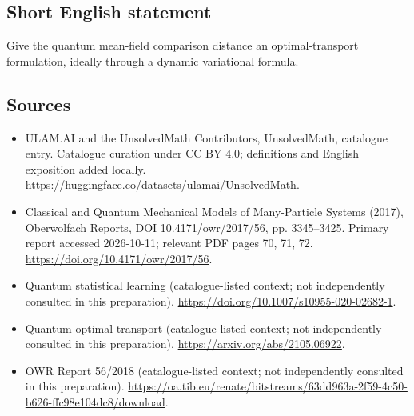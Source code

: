 \documentclass[11pt]{article}
\begin{document}
\subsection{Short English statement}
Give the quantum mean-field comparison distance an optimal-transport formulation, ideally through a dynamic variational formula.
\subsection{Sources}
\begin{itemize}
\item[\hypertarget{source:statement:1}{S1}] ULAM.AI and the UnsolvedMath Contributors, UnsolvedMath, catalogue entry. Catalogue curation under CC BY 4.0; definitions and English exposition added locally.
\url{https://huggingface.co/datasets/ulamai/UnsolvedMath}.
\item[\hypertarget{source:statement:2}{S2}] Classical and Quantum Mechanical Models of Many-Particle Systems (2017), Oberwolfach Reports, DOI 10.4171/owr/2017/56, pp. 3345--3425. Primary report accessed 2026-10-11; relevant PDF pages 70, 71, 72.
\url{https://doi.org/10.4171/owr/2017/56}.
\item[\hypertarget{source:statement:3}{S3}] Quantum statistical learning (catalogue-listed context; not independently consulted in this preparation).
\url{https://doi.org/10.1007/s10955-020-02682-1}.
\item[\hypertarget{source:statement:4}{S4}] Quantum optimal transport (catalogue-listed context; not independently consulted in this preparation).
\url{https://arxiv.org/abs/2105.06922}.
\item[\hypertarget{source:statement:5}{S5}] OWR Report 56/2018 (catalogue-listed context; not independently consulted in this preparation).
\url{https://oa.tib.eu/renate/bitstreams/63dd963a-2f59-4c50-b626-ffc98e104dc8/download}.
\end{itemize}
\label{end:statement}
\end{document}
